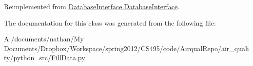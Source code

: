 Reimplemented from \hyperlink{class_database_interface_1_1_database_interface_a34cd488b227a7742298c622a70511ae1}{Database\-Interface.\-Database\-Interface}.



The documentation for this class was generated from the following file\-:\begin{DoxyCompactItemize}
\item 
A\-:/documents/nathan/\-My Documents/\-Dropbox/\-Workspace/spring2012/\-C\-S495/code/\-Airqual\-Repo/air\-\_\-quality/python\-\_\-src/\hyperlink{_fill_data_8py}{Fill\-Data.\-py}\end{DoxyCompactItemize}
